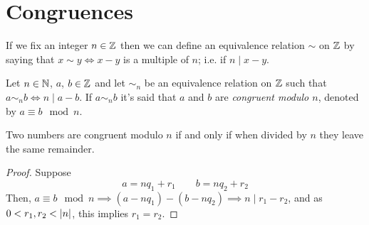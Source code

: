 \section{Congruences}

If we fix an integer $n\in\mathbb{Z}$ then we can define an equivalence relation $\sim$ on $\mathbb{Z}$ by saying that
$x\sim y \iff x - y$ is a multiple of $n$; i.e. if $n\mid x - y$.

\begin{defi}[Congruence]
    Let $n\in\mathbb{N}$, $a$, $b\in\mathbb{Z}$ and let $\sim_n$ be an equivalence relation on $\mathbb{Z}$
    such that $a\sim_n b \iff n\mid a - b$. If $a\sim_n b$ it's said that $a$ and $b$ are \textit{congruent
    modulo $n$}, denoted by $a\equiv b \mod n$.
\end{defi}


\begin{lemma}
    Two numbers are congruent modulo $n$ if and only if when divided by $n$ they leave the same remainder.
\end{lemma}

\begin{proof}
    Suppose
    \begin{equation}
        a = nq_1 + r_1\quad\quad b = nq_2 + r_2
    \end{equation}
    Then, $a\equiv b\mod n\implies \left( a - nq_1 \right)  - \left( b - nq_2 \right) \implies n\mid r_1 - r_2$,
    and as $0 < r_1, r_2 < \left\vert n \right\vert$, this implies $r_1 = r_2$.
\end{proof}


